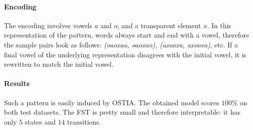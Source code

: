 \paragraph{Encoding}

The encoding involves vowels $a$ and $o$, and a transparent element $x$.
In this representation of the pattern, words always start and end with a vowel, therefore the sample pairs look as follows: \emph{(oaoxaa, oaoxao), (axooxa, axooxa)}, etc.
If a final vowel of the underlying representation disagrees with the initial vowel, it is rewritten to match the initial vowel.

\paragraph{Results}

Such a pattern is easily induced by OSTIA.
The obtained model scores $100$\% on both test datasets.
The FST is pretty small and therefore interpretable: it has only $5$ states and $14$ transitions.


\begin{table}[h!]
\centering
{}
\caption{Results of OSTIA learning a ``simple'' first-last harmony.}
\end{table}

